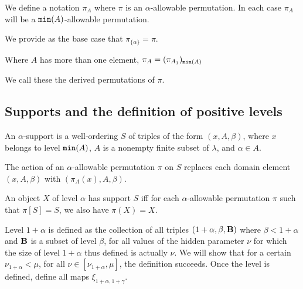 \documentclass[12pt]{article}
\begin{document}
We define a notation $\pi_A$ where $\pi$ is an $\alpha$-allowable permutation.  In each case $\pi_A$ will be a ${\tt min}(A)$-allowable permutation.

We provide as the base case that $\pi_{\{\alpha\}} = \pi$.

Where $A$ has more than one element, $\pi_A = (\pi_{A_1})_{{\tt min}(A)}$

We call these the derived permutations of $\pi$.

\subsection{Supports and the definition of positive levels}

An $\alpha$-support is a well-ordering $S$ of triples of the form $(x,A,\beta)$, where $x$ belongs to level ${\tt min}(A)$, $A$ is a nonempty finite subset of $\lambda$, and $\alpha \in A$.

The action of an $\alpha$-allowable permutation $\pi$ on $S$ replaces each domain element  $(x,A,\beta)$ with $(\pi_A(x),A,\beta)$.

An object $X$ of level $\alpha$ has support $S$ iff for each $\alpha$-allowable permutation $\pi$ such that $\pi[S]=S$, we also have $\pi(X)=X$.

Level $1+\alpha$ is defined as the collection of all triples $(1+\alpha,\beta,{\bf B})$ where $\beta<1+\alpha$ and ${\bf B}$ is a subset of level $\beta$, for all values of the hidden
parameter $\nu$ for which the size of level $1+\alpha$ thus defined is actually $\nu$.  We will show that for a certain $\nu_{1+\alpha}<\mu$, for all $\nu \in [\nu_{1+\alpha},\mu]$, the definition succeeds.  Once the level is defined, define all maps $\xi_{1+\alpha,1+\gamma}$.
\end{document}
